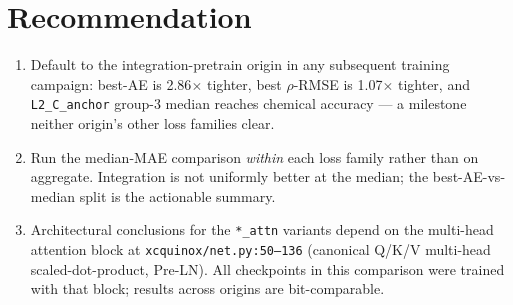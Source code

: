 \documentclass[11pt,letterpaper]{article}
\begin{document}
\section{Recommendation}

\begin{enumerate}
\item Default to the integration-pretrain origin in any subsequent training
  campaign: best-AE is 2.86$\times$ tighter, best $\rho$-RMSE is 1.07$\times$
  tighter, and \texttt{L2\_C\_anchor} group-3 median reaches chemical accuracy
  --- a milestone neither origin's other loss families clear.
\item Run the median-MAE comparison \emph{within} each loss family rather than
  on aggregate. Integration is not uniformly better at the median; the
  best-AE-vs-median split is the actionable summary.
\item Architectural conclusions for the \texttt{*\_attn} variants depend on
  the multi-head attention block at \texttt{xcquinox/net.py:50--136}
  (canonical Q/K/V multi-head scaled-dot-product, Pre-LN). All checkpoints
  in this comparison were trained with that block; results across origins
  are bit-comparable.
\end{enumerate}



\end{document}

